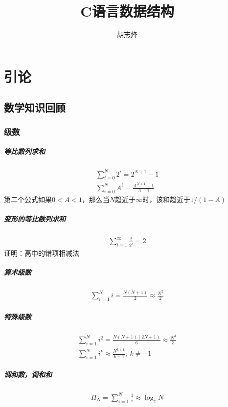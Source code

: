 \documentclass[utf8]{ctexbook}
\author{胡志烽}
\title{C语言数据结构}
\begin{document}
\maketitle
\chapter{引论}
\section{数学知识回顾}
\subsection{级数}
\paragraph{等比数列求和}
\begin{gather*}
    \sum_{i=0}^{N } 2^i = 2^{N+1} -1
    \\ \sum_{i=0}^{N } A^i = \frac{A^{N+1}-1}{A-1}
\end{gather*}
第二个公式如果$0<A<1$，那么当$N$趋近于$\infty$时，该和趋近于$1/(1-A)$
\paragraph{变形的等比数列求和}
\begin{gather*}
\sum_{i=1 }^{\infty } \frac{i }{2^i } = 2
\end{gather*}
证明：高中的错项相减法
\paragraph{算术级数}
\begin{gather*}
\sum_{i=1 }^{N } i = \frac{N(N+1)}{2}\approx \frac{N^2}{2}
\end{gather*}
\paragraph{特殊级数}
\begin{gather*}
    \sum_{i=1 }^{N}  i^2 = \frac{N(N+1)(2N+1)}{6}\approx \frac{N^3}3
    \\ \sum_{i=1 }^{N}  i ^k \approx \frac{N^{k+1 }}{k+1};\ k\ne -1
\end{gather*}
\paragraph{调和数，调和和}
\begin{gather*}
H_N = \sum_{i=1 }^{N } \frac 1i \approx \log _e N
\end{gather*}
\end{document}
